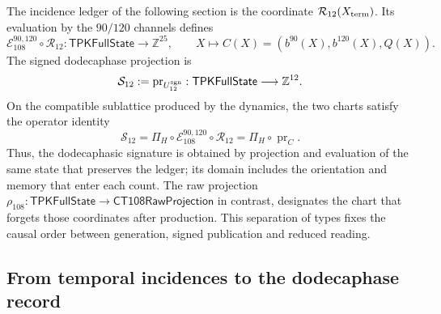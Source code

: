 The incidence ledger of the following section is the coordinate
\(\mathcal R_{12}(X_{\rm term})\). Its evaluation by the
\(90/120\) channels defines
\[
 \mathcal E_{108}^{90,120}\circ\mathcal R_{12}:
 \mathsf{TPKFullState}\longrightarrow\mathbb Z^{25},
 \qquad
 X\longmapsto C(X)=(b^{90}(X),b^{120}(X),Q(X)).
\]
The signed dodecaphase projection is
\[
 \mathcal S_{12}:=\operatorname{pr}_{U_{12}^{\rm sgn}}:
 \mathsf{TPKFullState}\longrightarrow\mathbb Z^{12}.
\]
On the compatible sublattice produced by the dynamics, the two charts
satisfy the operator identity
\begin{equation}
 \mathcal S_{12}
 =\Pi_H\circ\mathcal E_{108}^{90,120}\circ\mathcal R_{12}
 =\Pi_H\circ\operatorname{pr}_{C}.
 \label{vi:vi:dep:identidad-productor-e108}
\end{equation}
Thus, the dodecaphasic signature is obtained by projection and evaluation of the same
state that preserves the ledger; its domain includes the orientation and memory
that enter each count. The raw projection
\(\rho_{108}:\mathsf{TPKFullState}\to\mathsf{CT108RawProjection}\)
in contrast, designates the chart that forgets those coordinates after
production. This separation of types fixes the causal order between generation,
signed publication and reduced reading.

\subsection{From temporal incidences to the dodecaphase record}
\label{vi:vi:dep:registro}\label{vi:subsec:k-registro-integral}

